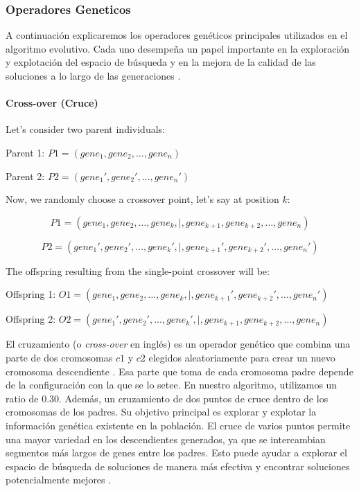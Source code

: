 \subsubsection{Operadores Geneticos }

A continuación explicaremos los operadores genéticos principales utilizados en
el algoritmo evolutivo. Cada uno desempeña un papel importante en la exploración
y explotación  del espacio de búsqueda y en la mejora de la
calidad de las soluciones a lo largo de las generaciones
.

\paragraph{Cross-over (Cruce)}


Let's consider two parent individuals:

Parent 1: $P1 = (gene_1, gene_2, \ldots, gene_n)$

Parent 2: $P2 = (gene_1', gene_2', \ldots, gene_n')$

Now, we randomly choose a crossover point, let's say at position $k$:

\[
P1 = (gene_1, gene_2, \ldots, gene_k, |, gene_{k+1}, gene_{k+2}, \ldots, gene_n)
\]

\[
P2 = (gene_1', gene_2', \ldots, gene_k', |, gene_{k+1}', gene_{k+2}', \ldots, gene_n')
\]

The offspring resulting from the single-point crossover will be:

Offspring 1: $O1 = (gene_1, gene_2, \ldots, gene_k, |, gene_{k+1}', gene_{k+2}', \ldots, gene_n')$

Offspring 2: $O2 = (gene_1', gene_2', \ldots, gene_k', |, gene_{k+1}, gene_{k+2}, \ldots, gene_n)$





El cruzamiento (o \emph{cross-over} en inglés) es un operador genético que
combina una parte de dos cromosomas $c1$ y $c2$ elegidos aleatoriamente para
crear un nuevo cromosoma descendiente . Esa parte que toma de cada cromosoma padre
depende de la configuración con la que se lo setee. En nuestro algoritmo,
utilizamos un ratio de 0.30. Además, un cruzamiento de dos puntos  de cruce dentro de los cromosomas de los padres. Su objetivo principal es explorar y explotar la información genética existente en la población.
El cruce de varios puntos permite una mayor variedad en los descendientes
generados, ya que se intercambian segmentos más largos de genes entre los
padres. Esto puede ayudar a explorar el espacio de búsqueda de soluciones de
manera más efectiva y encontrar soluciones potencialmente mejores .

